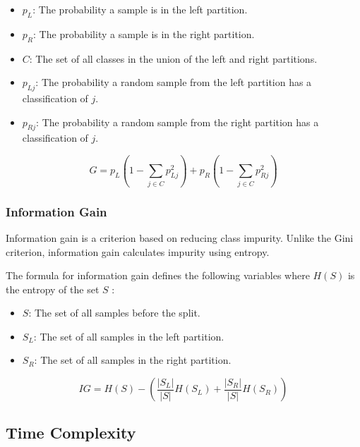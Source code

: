 \documentclass[10pt]{article} %
\begin{document}
\begin{itemize}
    \setlength{\itemsep}{0.1em} 
    \item \( p_L \): The probability a sample is in the left partition.
    \item \( p_R \): The probability a sample is in the right partition.
    \item \( C \): The set of all classes in the union of the left and right partitions.
    \item \( p_{Lj} \): The probability a random sample from the left partition has a classification of \( j \).
    \item \( p_{Rj} \): The probability a random sample from the right partition has a classification of \( j \).
\end{itemize}

\begin{equation*}
	G = p_L \left(1 - \sum_{j\in C} p_{Lj}^2 \right) + p_R \left(1 - \sum_{j \in C} p_{Rj}^2 \right)
	\label{gini_equ}
\end{equation*}

\subsubsection{Information Gain}\label{IG}

Information gain is a criterion based on reducing class impurity. Unlike the Gini criterion, information gain calculates impurity using entropy.

The formula for information gain defines the following variables where $H(S)$ is the entropy of the set $S$ \citep{it}:

\begin{itemize}
    \setlength{\itemsep}{0.1em} 
    \item \(S \): The set of all samples before the split.
    \item \(S_L \): The set of all samples in the left partition.
    \item \(S_R \): The set of all samples in the right partition.
\end{itemize}

\begin{equation*}
	IG = H(S) - \left( \frac{|S_{L}|}{|S|} H(S_{L}) + \frac{|S_{R}|}{|S|} H(S_{R}) \right)
\end{equation*}

\subsection{Time Complexity}\label{complexity}
\end{document}
